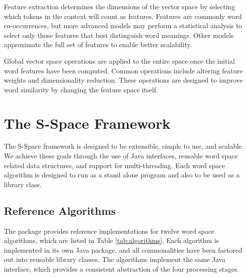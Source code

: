 Feature extraction determines the dimensions of the vector space by selecting
which tokens in the context will count as features.  Features are commonly word
co-occurrences, but more advanced models may perform a statistical analysis to
select only those features that best distinguish word meanings.  Other models
approximate the full set of features to enable better scalability.

Global vector space operations are applied to the entire space once the initial
word features have been computed.  Common operations include altering feature
weights and dimensionality reduction.  These operations are designed to improve
word similarity by changing the feature space itself.

\section{The S-Space Framework}

The S-Space framework is designed to be extensible, simple to use, and scalable.
We achieve these goals through the use of Java interfaces, reusable word space
related data structures, and support for multi-threading.  Each word space
algorithm is designed to run as a stand alone program and also to be used as a
library class.

\subsection{Reference Algorithms}

The package provides reference implementations for twelve word space algorithms,
which are listed in Table \ref{tab:algorithms}.  Each algorithm is implemented
in its own Java package, and all commonalities have been factored out into
reusable library classes.  The algorithms implement the same Java interface,
which provides a consistent abstraction of the four processing stages.

